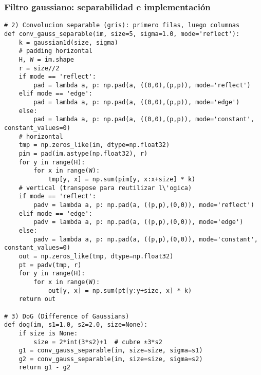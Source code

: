 \documentclass[10pt]{beamer}
\begin{document}
\begin{frame}[fragile]
\frametitle{Filtro gaussiano: separabilidad e implementaci\'on}
{\tiny
\begin{verbatim}
# 2) Convolucion separable (gris): primero filas, luego columnas
def conv_gauss_separable(im, size=5, sigma=1.0, mode='reflect'):
    k = gaussian1d(size, sigma)
    # padding horizontal
    H, W = im.shape
    r = size//2
    if mode == 'reflect':
        pad = lambda a, p: np.pad(a, ((0,0),(p,p)), mode='reflect')
    elif mode == 'edge':
        pad = lambda a, p: np.pad(a, ((0,0),(p,p)), mode='edge')
    else:
        pad = lambda a, p: np.pad(a, ((0,0),(p,p)), mode='constant', constant_values=0)
    # horizontal
    tmp = np.zeros_like(im, dtype=np.float32)
    pim = pad(im.astype(np.float32), r)
    for y in range(H):
        for x in range(W):
            tmp[y, x] = np.sum(pim[y, x:x+size] * k)
    # vertical (transpose para reutilizar l\'ogica)
    if mode == 'reflect':
        padv = lambda a, p: np.pad(a, ((p,p),(0,0)), mode='reflect')
    elif mode == 'edge':
        padv = lambda a, p: np.pad(a, ((p,p),(0,0)), mode='edge')
    else:
        padv = lambda a, p: np.pad(a, ((p,p),(0,0)), mode='constant', constant_values=0)
    out = np.zeros_like(tmp, dtype=np.float32)
    pt = padv(tmp, r)
    for y in range(H):
        for x in range(W):
            out[y, x] = np.sum(pt[y:y+size, x] * k)
    return out

# 3) DoG (Difference of Gaussians)
def dog(im, s1=1.0, s2=2.0, size=None):
    if size is None:
        size = 2*int(3*s2)+1  # cubre ±3*s2
    g1 = conv_gauss_separable(im, size=size, sigma=s1)
    g2 = conv_gauss_separable(im, size=size, sigma=s2)
    return g1 - g2
\end{verbatim}
}
\end{frame}
\end{document}

